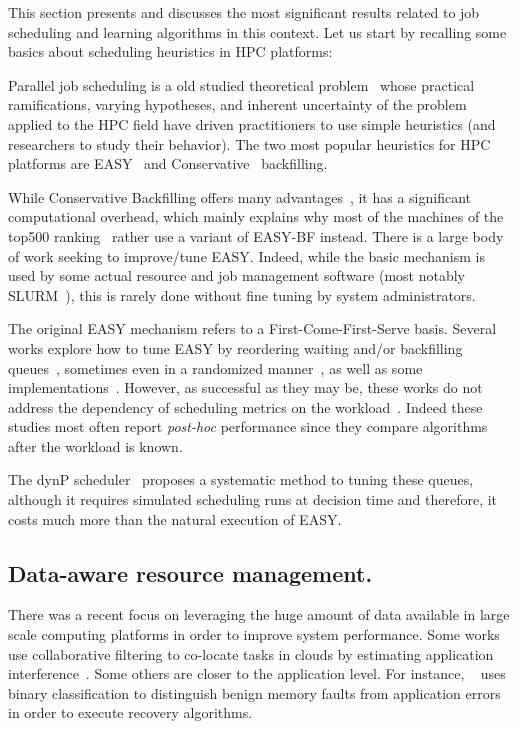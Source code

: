 \documentclass[sigconf,anonymous]{acmart}
\begin{document}
This section presents and discusses the most significant results related to job
scheduling and learning algorithms in this context.  Let us start by recalling
some basics about scheduling heuristics in HPC platforms:

Parallel job scheduling is a old studied theoretical
problem~\cite{Frachtenberg:2009:JSS:1692356,Feitelson:2004:PJS:2128864.2128865}
whose practical ramifications, varying hypotheses, and inherent uncertainty of
the problem applied to the HPC field have driven practitioners to use simple
heuristics (and researchers to study their behavior). The two most popular
heuristics for HPC platforms are EASY~\cite{easy} and
Conservative~\cite{Mu'alem:2001:UPW:380314.380315} backfilling.

While Conservative Backfilling offers many advantages~\cite{bfchar}, it has a
significant computational overhead, which mainly explains why most of the
machines of the top500 ranking~\cite{top500} rather use a variant of EASY-BF
instead.  There is a large body of work seeking to improve/tune EASY. Indeed,
while the basic mechanism is used by some actual resource and job management
software (most notably SLURM~\cite{SLURMdocSCHED}), this is rarely done
without fine tuning by system administrators.

The original EASY mechanism refers to a First-Come-First-Serve basis.  Several
works explore how to tune EASY by reordering waiting and/or backfilling
queues~\cite{Tsafrir_easypp_2005}, sometimes even in a randomized
manner~\cite{1592720}, as well as some implementations~\cite{Jackson2001}.
However, as successful as they may be, these works do not address the
dependency of scheduling metrics on the workload~\cite{variability}. Indeed
these studies most often report \textit{post-hoc} performance since they
compare algorithms after the workload is known.

The dynP scheduler~\cite{streit_selftuning_2002} proposes a systematic
method to tuning these queues, although it requires simulated scheduling runs
at decision time and therefore, it costs much more than the natural execution of EASY.

\subsection{Data-aware resource management.}

There was a recent focus on leveraging the huge amount of data available in
large scale computing platforms in order to improve system performance. Some
works use collaborative filtering to co-locate tasks in clouds by estimating
application interference~\cite{7516031}. Some others are closer to the
application level. For instance, ~\cite{fmodeling} uses binary classification
to distinguish benign memory faults from application errors in order to execute
recovery algorithms.
\end{document}
